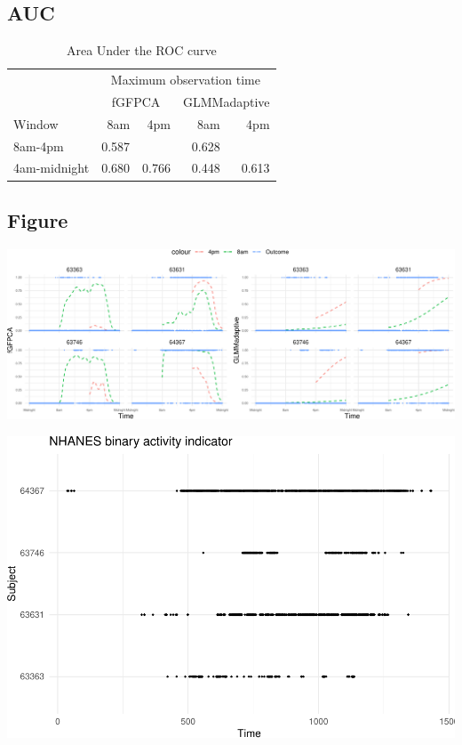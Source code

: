 \documentclass[
]{article}
\begin{document}
\hypertarget{auc-2}{%
\subsection{AUC}\label{auc-2}}

\begin{table}

\caption{\label{tab:unnamed-chunk-10}Area Under the ROC curve}
\centering
\begin{tabular}[t]{lrrrr}
\toprule
\multicolumn{1}{c}{ } & \multicolumn{4}{c}{Maximum observation time} \\
\cmidrule(l{3pt}r{3pt}){2-5}
\multicolumn{1}{c}{ } & \multicolumn{2}{c}{fGFPCA} & \multicolumn{2}{c}{GLMMadaptive} \\
\cmidrule(l{3pt}r{3pt}){2-3} \cmidrule(l{3pt}r{3pt}){4-5}
Window & 8am & 4pm & 8am & 4pm\\
\midrule
8am-4pm & 0.587 &  & 0.628 & \\
4am-midnight & 0.680 & 0.766 & 0.448 & 0.613\\
\bottomrule
\end{tabular}
\end{table}

\hypertarget{figure-2}{%
\subsection{Figure}\label{figure-2}}

\includegraphics{manuscript_files/figure-latex/pred_nhanes-1.pdf}

\includegraphics{manuscript_files/figure-latex/small_exp-1.pdf}
\end{document}
